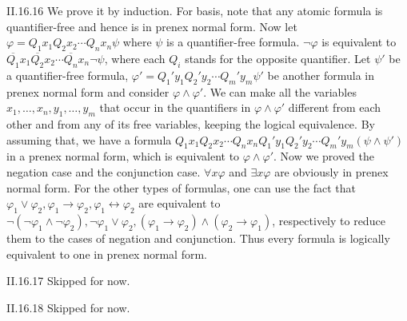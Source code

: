 \documentclass[12pt]{article}
\begin{document}
\begin{customthm}{II.16.16}
  We prove it by induction. For basis, note that any atomic formula is quantifier-free and hence is in prenex normal form. Now let $\varphi=Q_1x_1Q_2x_2\cdots Q_nx_n\psi$ where $\psi$ is a quantifier-free formula. $\neg\varphi$ is equivalent to $\overline{Q_1}x_1\overline{Q_2}x_2\cdots\overline{Q_n}x_n\neg\psi$, where each $Q_i$ stands for the opposite quantifier. Let $\psi'$ be a quantifier-free formula, $\varphi'=Q_1'y_1Q_2'y_2\cdots Q_m'y_m\psi'$ be another formula in prenex normal form and consider $\varphi\wedge\varphi'$. We can make all the variables $x_1,\ldots,x_n,y_1,\ldots,y_m$ that occur in the quantifiers in $\varphi\wedge\varphi'$ different from each other and from any of its free variables, keeping the logical equivalence. By assuming that, we have a formula $Q_1x_1Q_2x_2\cdots Q_nx_nQ_1'y_1Q_2'y_2\cdots Q_m'y_m(\psi\wedge\psi')$ in a prenex normal form, which is equivalent to $\varphi\wedge\varphi'$. Now we proved the negation case and the conjunction case. $\forall x\varphi$ and $\exists x\varphi$ are obviously in prenex normal form. For the other types of formulas, one can use the fact that $\varphi_1\vee\varphi_2,\varphi_1\rightarrow\varphi_2,\varphi_1\leftrightarrow\varphi_2$ are equivalent to $\neg(\neg\varphi_1\wedge\neg\varphi_2), \neg\varphi_1\vee\varphi_2,(\varphi_1\rightarrow\varphi_2)\wedge(\varphi_2\rightarrow\varphi_1)$, respectively to reduce them to the cases of negation and conjunction. Thus every formula is logically equivalent to one in prenex normal form.
\end{customthm}

\begin{customthm}{II.16.17}
  Skipped for now.
\end{customthm}

\begin{customthm}{II.16.18}
  Skipped for now.
\end{customthm}
\end{document}
